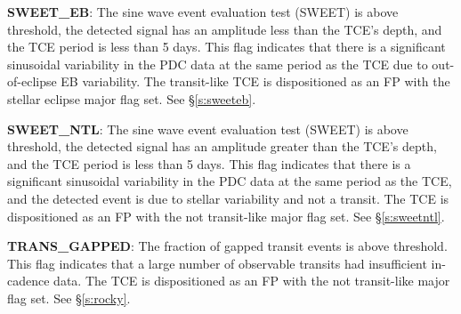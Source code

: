 
\textbf{SWEET\_EB}: The sine wave event evaluation test (SWEET) is above threshold, the detected signal has an amplitude less than the TCE's depth, and the TCE period is less than 5 days. This flag indicates that there is a significant sinusoidal variability in the PDC data at the same period as the TCE due to out-of-eclipse EB variability. The transit-like TCE is dispositioned as an FP with the stellar eclipse major flag set. See \S\ref{s:sweeteb}.

\textbf{SWEET\_NTL}: The sine wave event evaluation test (SWEET) is above threshold, the detected signal has an amplitude greater than the TCE's depth, and the TCE period is less than 5 days. This flag indicates that there is a significant sinusoidal variability in the PDC data at the same period as the TCE, and the detected event is due to stellar variability and not a transit. The TCE is dispositioned as an FP with the not transit-like major flag set. See \S\ref{s:sweetntl}.

\textbf{TRANS\_GAPPED}: The fraction of gapped transit events is above threshold. This flag indicates that a large number of observable transits had insufficient in-cadence data. The TCE is dispositioned as an FP with the not transit-like major flag set. See \S\ref{s:rocky}.

